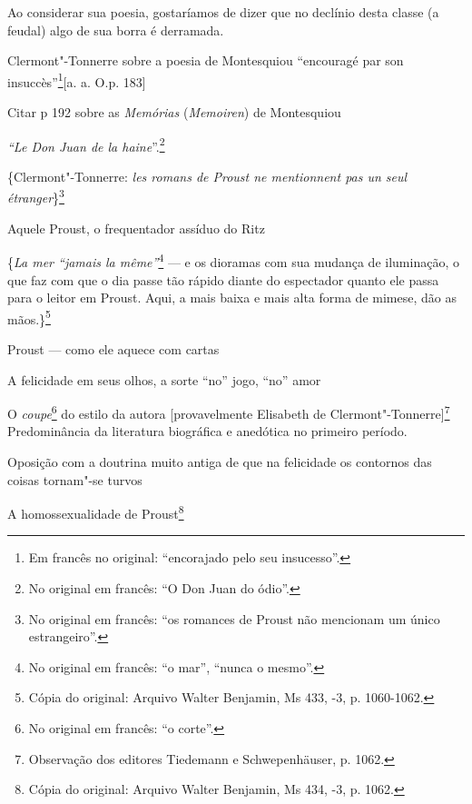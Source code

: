 Ao considerar sua poesia, gostaríamos de dizer que no declínio desta
classe (a feudal) algo de sua borra é derramada.

Clermont"-Tonnerre sobre a poesia de Montesquiou ``encouragé par son
insuccès''\footnote{Em francês no original: ``encorajado pelo seu insucesso''. \versal{[N. T.]}}{[}a. a. O.p. 183{]}

Citar p 192 sobre as \emph{Memórias} (\emph{Memoiren}) de Montesquiou

\emph{``Le Don Juan de la haine}''.\footnote{No original em
  francês: ``O Don Juan do ódio''. \versal{[N. T.]}}

\{Clermont"-Tonnerre: \emph{les romans de Proust ne mentionnent pas un
seul étranger}\}\footnote{No original em francês: ``os romances
  de Proust não mencionam um único estrangeiro''. \versal{[N. T.]}}

Aquele Proust, o frequentador assíduo do Ritz

\{\emph{La mer ``jamais la même''}\footnote{No original em francês: ``o mar'', ``nunca o mesmo''. \versal{[N. T.]}} --- e os dioramas com sua
mudança de iluminação, o que faz com que o dia passe tão rápido diante
do espectador quanto ele passa para o leitor em Proust. Aqui, a mais
baixa e mais alta forma de mimese, dão as mãos.\}\footnote{Cópia do original: Arquivo Walter Benjamin, Ms 433, -3, p. 1060-1062.}

Proust --- como ele aquece com cartas

A felicidade em seus olhos, a sorte ``no'' jogo, ``no'' amor

O \emph{coupe}\footnote{No original em francês: ``o corte''. \versal{[N. T.]}} do
estilo da autora {[}provavelmente Elisabeth de Clermont"-Tonnerre{]}\footnote{Observação dos editores Tiedemann e
  Schwepenhäuser, p. 1062. \versal{[N. E.]}} Predominância da literatura biográfica e
anedótica no primeiro período.

Oposição com a doutrina muito antiga de que na felicidade os contornos
das coisas tornam"-se turvos

A homossexualidade de Proust\footnote{Cópia do original: Arquivo Walter Benjamin, Ms 434,
-3, p. 1062.}

